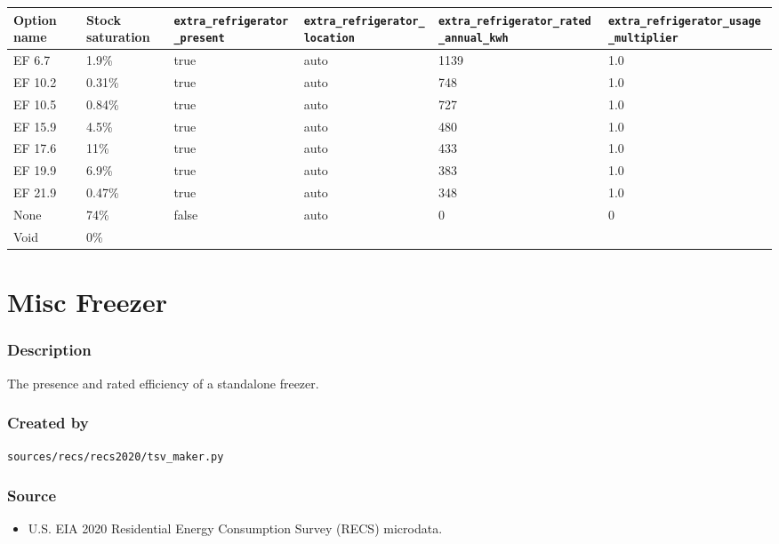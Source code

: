 \begin{longtable}[]{@{}llllll@{}}
\toprule\noalign{}
Option name & Stock saturation & \texttt{extra\_refrigerator\_present} &
\texttt{extra\_refrigerator\_location} &
\texttt{extra\_refrigerator\_rated\_annual\_kwh} &
\texttt{extra\_refrigerator\_usage\_multiplier} \\
\midrule\noalign{}
\endhead
\bottomrule\noalign{}
\endlastfoot
EF 6.7 & 1.9\% & true & auto & 1139 & 1.0 \\
EF 10.2 & 0.31\% & true & auto & 748 & 1.0 \\
EF 10.5 & 0.84\% & true & auto & 727 & 1.0 \\
EF 15.9 & 4.5\% & true & auto & 480 & 1.0 \\
EF 17.6 & 11\% & true & auto & 433 & 1.0 \\
EF 19.9 & 6.9\% & true & auto & 383 & 1.0 \\
EF 21.9 & 0.47\% & true & auto & 348 & 1.0 \\
None & 74\% & false & auto & 0 & 0 \\
Void & 0\% & & & & \\
\end{longtable}

\section{Misc Freezer}\label{misc_freezer}

\subsubsection{Description}\label{description-111}

The presence and rated efficiency of a standalone freezer.

\subsubsection{Created by}\label{created-by-112}

\texttt{sources/recs/recs2020/tsv\_maker.py}

\subsubsection{Source}\label{source-114}

\begin{itemize}
 
\item
  U.S. EIA 2020 Residential Energy Consumption Survey (RECS) microdata.
\end{itemize}

